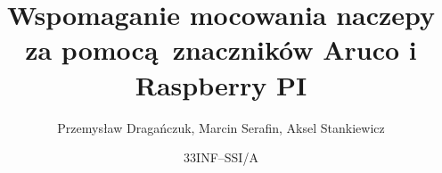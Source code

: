 


\title{Wspomaganie mocowania naczepy za pomocą znaczników Aruco i Raspberry PI}
\author{Przemysław Dragańczuk, Marcin Serafin, Aksel Stankiewicz}
\date{33INF--SSI/A}



\maketitle
\newpage








